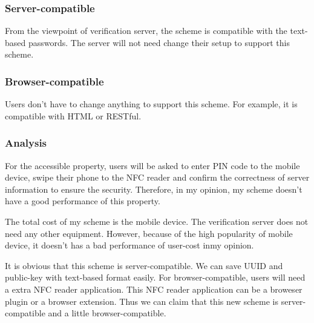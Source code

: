 \begin{CJK}{Bg5}{bsmi}
\subsubsection{Server-compatible}

From the viewpoint of verification server, the scheme is compatible with the text-based passwords. The server will not need change their setup to support this scheme. 
\subsubsection{Browser-compatible}

Users don't have to change anything to support this scheme. For example, it is compatible with HTML or RESTful.

\subsubsection{Analysis}

For the accessible property, users will be asked to enter PIN code to the mobile device, swipe their phone to the NFC reader and confirm the correctness of server information to ensure the security. Therefore, in my opinion, my scheme doesn't have a good performance of this property.

The total cost of my scheme is the mobile device. The verification server does not need any other equipment. However, because of the high popularity of mobile device, it doesn't has a bad performance of user-cost inmy opinion.

It is obvious that this scheme is server-compatible. We can save UUID and public-key with text-based format easily. For browser-compatible, users will need a extra NFC reader application. This NFC reader application can be a broweser plugin or a browser extension. Thus we can claim that this new scheme is server-compatible and a little browser-compatible.

\end{CJK}